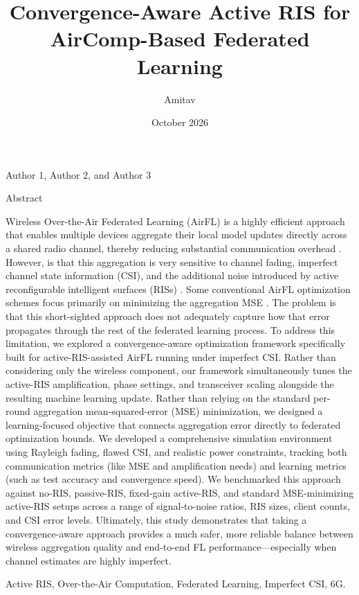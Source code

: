\documentclass[10pt,twocolumn]{article}
\title{Convergence-Aware Active RIS for AirComp-Based Federated Learning}
\author{Amitav}
\date{October 2026}
\begin{document}
\maketitle

Author 1, Author 2, and Author 3  \parencite{ruizhe_long_83e9453a}

Abstract

Wireless Over-the-Air Federated Learning (AirFL) is a highly efficient approach that enables multiple devices aggregate their local model updates directly across a shared radio channel, thereby reducing substantial communication overhead  \parencite{zhijin_qin_43e06c44}. However, is that this aggregation is very sensitive to channel fading, imperfect channel state information (CSI), and the additional noise introduced by active reconfigurable intelligent surfaces (RISs)  \parencite[]{jingheng_zheng_80cd7b06, ruizhe_long_83e9453a}. Some conventional AirFL optimization schemes focus primarily on minimizing the aggregation MSE  \parencite{wanli_ni_d7a6fb6d}. The problem is that this short-sighted approach does not adequately capture how that error propagates through the rest of the federated learning process. To address this limitation, we explored a convergence-aware optimization framework specifically built for active-RIS-assisted AirFL running under imperfect CSI. Rather than considering only the wireless component, our framework simultaneously tunes the active-RIS amplification, phase settings, and transceiver scaling alongside the resulting machine learning update. Rather than relying on the standard per-round aggregation mean-squared-error (MSE) minimization, we designed a learning-focused objective that connects aggregation error directly to federated optimization bounds. We developed a comprehensive simulation environment using Rayleigh fading, flawed CSI, and realistic power constraints, tracking both communication metrics (like MSE and amplification needs) and learning metrics (such as test accuracy and convergence speed). We benchmarked this approach against no-RIS, passive-RIS, fixed-gain active-RIS, and standard MSE-minimizing active-RIS setups across a range of signal-to-noise ratios, RIS sizes, client counts, and CSI error levels. Ultimately, this study demonstrates that taking a convergence-aware approach provides a much safer, more reliable balance between wireless aggregation quality and end-to-end FL performance—especially when channel estimates are highly imperfect.

Active RIS, Over-the-Air Computation, Federated Learning, Imperfect CSI, 6G.
\end{document}
